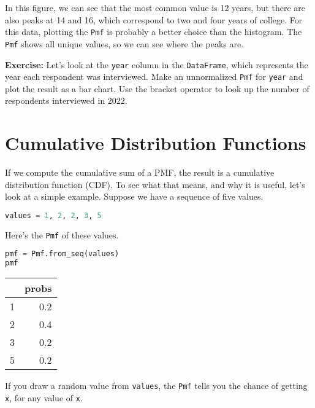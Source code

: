 In this figure, we can see that the most common value is 12 years, but
there are also peaks at 14 and 16, which correspond to two and four
years of college. For this data, plotting the
\passthrough{\lstinline!Pmf!} is probably a better choice than the
histogram. The \passthrough{\lstinline!Pmf!} shows all unique values, so
we can see where the peaks are.

\textbf{Exercise:} Let's look at the \passthrough{\lstinline!year!}
column in the \passthrough{\lstinline!DataFrame!}, which represents the
year each respondent was interviewed. Make an unnormalized
\passthrough{\lstinline!Pmf!} for \passthrough{\lstinline!year!} and
plot the result as a bar chart. Use the bracket operator to look up the
number of respondents interviewed in 2022.

\section{Cumulative Distribution
Functions}\label{cumulative-distribution-functions}

If we compute the cumulative sum of a PMF, the result is a cumulative
distribution function (CDF). To see what that means, and why it is
useful, let's look at a simple example. Suppose we have a sequence of
five values.

\begin{lstlisting}[language=Python,style=source]
values = 1, 2, 2, 3, 5
\end{lstlisting}

\pagebreak

Here's the \passthrough{\lstinline!Pmf!} of these values.

\begin{lstlisting}[language=Python,style=source]
pmf = Pmf.from_seq(values)
pmf
\end{lstlisting}

\begin{tabular}{lr}
\toprule
 & probs \\
\midrule
1 & 0.2 \\
2 & 0.4 \\
3 & 0.2 \\
5 & 0.2 \\
\bottomrule
\end{tabular}

If you draw a random value from \passthrough{\lstinline!values!}, the
\passthrough{\lstinline!Pmf!} tells you the chance of getting
\passthrough{\lstinline!x!}, for any value of
\passthrough{\lstinline!x!}.

